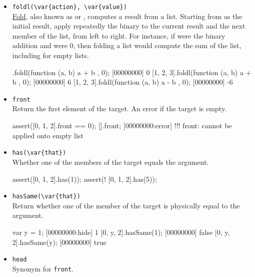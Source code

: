 \begin{itemize}
\item \lstinline|foldl(\var{action}, \var{value})|\\
  \href{http://en.wikipedia.org/wiki/Fold_(higher-order_function)}{Fold},
  also known as  or , computes a result
  from a list.  Starting from  as the initial result, apply
  repeatedly the binary  to the current result and the
  next member of the list, from left to right.  For instance, if
   were the binary addition and  were 0, then
  folding a list would compute the sum of the list, including for
  empty lists.

\begin{urbiscript}[firstnumber=last]
[].foldl(function (a, b) { a + b }, 0);
[00000000] 0
[1, 2, 3].foldl(function (a, b) { a + b }, 0);
[00000000] 6
[1, 2, 3].foldl(function (a, b) { a - b }, 0);
[00000000] -6
\end{urbiscript}

\item \lstinline|front|\\
  Return the first element of the target. An error if the target is
  empty.

\begin{urbiscript}[firstnumber=last]
assert([0, 1, 2].front == 0);
[].front;
[00000000:error] !!! front: cannot be applied onto empty list
\end{urbiscript}

\item \lstinline|has(\var{that})|\\
  Whether one of the members of the target equals the argument.

\begin{urbiscript}[firstnumber=last]
assert([0, 1, 2].has(1));
assert(! [0, 1, 2].has(5));
\end{urbiscript}

\item \lstinline|hasSame(\var{that})|\\
  Return whether one of the member of the target is physically equal
  to the argument.

\begin{urbiscript}[firstnumber=last]
var y = 1;
[00000000:hide] 1
[0, y, 2].hasSame(1);
[00000000] false
[0, y, 2].hasSame(y);
[00000000] true
\end{urbiscript}

\item \lstinline|head|\\
  Synonym for \lstinline|front|.


\end{itemize}
